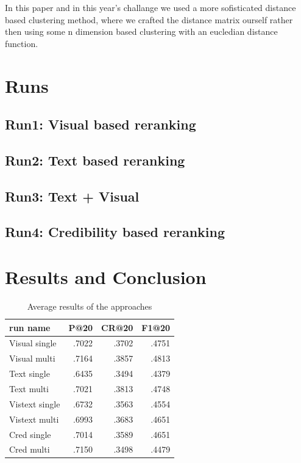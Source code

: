 \documentclass{sig-alternate}
\begin{document}
In this paper and in this year's challange we used a more sofisticated distance based clustering method, where we crafted the distance matrix ourself rather then using some n dimension based clustering with an eucledian distance function.

\section{Runs}

\subsection{Run1: Visual based reranking}

\subsection{Run2: Text based reranking}

\subsection{Run3: Text + Visual}

\subsection{Run4: Credibility based reranking}

\section{Results and Conclusion}

\begin{table}[h]
	\centering
\begin{tabular}{|l|r|r|r|}
	\hline 
	run name & P@20 & CR@20 & F1@20\tabularnewline
	\hline 
	\hline 
	Visual single & .7022 & .3702 & .4751\tabularnewline
	\hline 
	Visual multi & .7164 & .3857 & .4813\tabularnewline
	\hline 
	Text single & .6435 & .3494 & .4379\tabularnewline
	\hline 
	Text multi & .7021 & .3813 & .4748\tabularnewline
	\hline 
	Vistext single & .6732 & .3563 & .4554\tabularnewline
	\hline 
	Vistext multi & .6993 & .3683 & .4651\tabularnewline
	\hline 
	Cred single & .7014 & .3589 & .4651\tabularnewline
	\hline 
	Cred multi & .7150 & .3498 & .4479\tabularnewline
	\hline 
\end{tabular}
\label{table:results}
\caption{Average results of the approaches}
\end{table}
\end{document}
